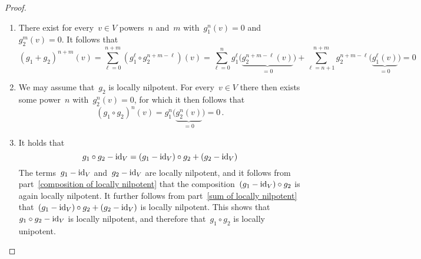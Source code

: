 \begin{proof}
  \leavevmode
  \begin{enumerate}
    \item
      There exist for every~$v \in V$ powers~$n$ and~$m$ with~$g_1^n(v) = 0$ and~$g_2^m(v) = 0$.
      It follows that
      \[
          (g_1 + g_2)^{n+m}(v)
        = \sum_{\ell=0}^{n+m} \left( g_1^\ell \circ g_2^{n+m-\ell} \right)(v)
        =   \sum_{\ell=0}^n g_1^\ell \bigl( \underbrace{g_2^{n+m-\ell}(v)}_{=0} \bigr)
          + \sum_{\ell=n+1}^{n+m} g_2^{n+m-\ell} \bigl( \underbrace{g_1^\ell(v)}_{=0} \bigr)
        = 0
      \]
    \item
      We may assume that~$g_2$ is locally nilpotent.
      For every~$v \in V$ there then exists some power~$n$ with~$g_2^n(v) = 0$, for which it then follows that
      \[
          (g_1 \circ g_2)^n(v)
        = g_1^n\bigl( \underbrace{g_2^n(v)}_{=0} \bigr)
        = 0 \,.
      \]
    \item
      It holds that
      \[
          g_1 \circ g_2 - \operatorname{id}_V
        = (g_1 - \operatorname{id}_V) \circ g_2 + (g_2 - \operatorname{id}_V)
      \]
      The terms~$g_1 - \operatorname{id}_V$ and~$g_2 - \operatorname{id}_V$ are locally nilpotent, and it follows from part~\ref*{composition of locally nilpotent} that the composition~$(g_1 - \operatorname{id}_V) \circ g_2$ is again locally nilpotent.
      It further follows from part~\ref*{sum of locally nilpotent} that~$(g_1 - \operatorname{id}_V) \circ g_2 + (g_2 - \operatorname{id}_V)$ is locally nilpotent.
      This shows that~$g_1 \circ g_2 - \operatorname{id}_V$ is locally nilpotent, and therefore that~$g_1 \circ g_2$ is locally unipotent.
    \qedhere
  \end{enumerate}
\end{proof}


